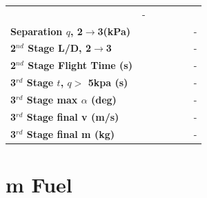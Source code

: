 \begin{table}[ht]
\begin{tabular}{l c c c c c c}
	& -
	\\
	\textbf{Separation $q$, 2$\rightarrow$3(kPa)}
	& \secondthirdSeparationqmSPARTANNinetyFive
	& \secondthirdSeparationqmSPARTANNinetySevenFive
	& \secondthirdSeparationqmSPARTANStandard
	& \secondthirdSeparationqmSPARTANOneHundredTwoFive
	& \secondthirdSeparationqmSPARTANOneHundredFive
	& -
	\\
	\textbf{2$^{nd}$ Stage L/D, 2$\rightarrow$3}
	& \secondthirdSeparationLDmSPARTANNinetyFive
	& \secondthirdSeparationLDmSPARTANNinetySevenFive
	& \secondthirdSeparationLDmSPARTANStandard
	& \secondthirdSeparationLDmSPARTANOneHundredTwoFive
	& \secondthirdSeparationLDmSPARTANOneHundredFive
	& -
	\\
	\textbf{2$^{nd}$ Stage Flight Time (s)}
	& \secondFlightTimemSPARTANNinetyFive
	& \secondFlightTimemSPARTANNinetySevenFive
	& \secondFlightTimemSPARTANStandard
	& \secondFlightTimemSPARTANOneHundredTwoFive
	& \secondFlightTimemSPARTANOneHundredFive
	& -
	\\
	\textbf{3$^{rd}$ Stage $t$, $q >$ 5kpa (s)}
	& \thirdqOverFivemSPARTANNinetyFive
	& \thirdqOverFivemSPARTANNinetySevenFive
	& \thirdqOverFivemSPARTANStandard
	& \thirdqOverFivemSPARTANOneHundredTwoFive
	& \thirdqOverFivemSPARTANOneHundredFive
	& -
	\\
	\textbf{3$^{rd}$ Stage max $\alpha$ (deg)}
	& \thirdmaxAoAmSPARTANNinetyFive
	& \thirdmaxAoAmSPARTANNinetySevenFive
	& \thirdmaxAoAmSPARTANStandard
	& \thirdmaxAoAmSPARTANOneHundredTwoFive
	& \thirdmaxAoAmSPARTANOneHundredFive
	& -
	\\
	\textbf{3$^{rd}$ Stage final v (m/s)}
	& \thirdcircvmSPARTANNinetyFive
	& \thirdcircvmSPARTANNinetySevenFive
	& \thirdcircvmSPARTANStandard
	& \thirdcircvmSPARTANOneHundredTwoFive
	& \thirdcircvmSPARTANOneHundredFive
	& -
	\\
	\textbf{3$^{rd}$ Stage final m (kg)}
	& \thirdcircmmSPARTANNinetyFive
	& \thirdcircmmSPARTANNinetySevenFive
	& \thirdcircmmSPARTANStandard
	& \thirdcircmmSPARTANOneHundredTwoFive
	& \thirdcircmmSPARTANOneHundredFive
	& -
	\\
	\hline 
\end{tabular} 
\end{table}

\section{m Fuel}

